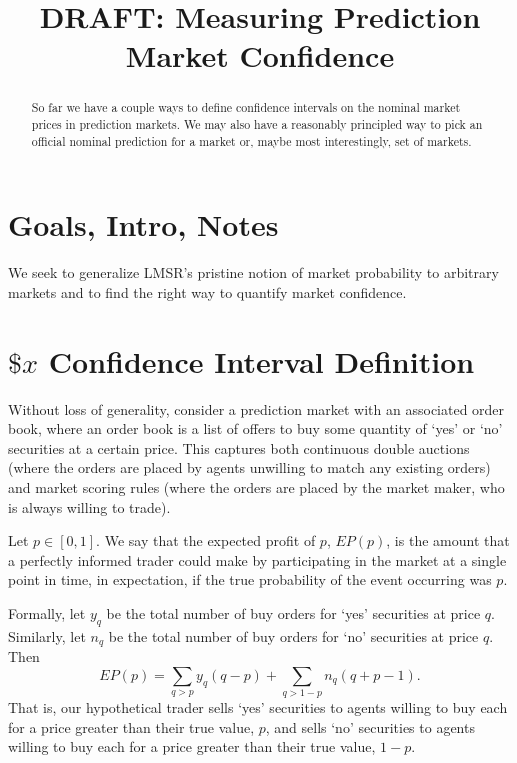 \documentclass{article}
\title{DRAFT: Measuring Prediction Market Confidence}
\author{}
\begin{document}
\maketitle

\begin{abstract}
So far we have a couple ways to define confidence intervals on the nominal market prices in prediction markets.
We may also have a reasonably principled way to pick an official nominal prediction for a market or, maybe most interestingly, set of markets.
\end{abstract}


\section{Goals, Intro, Notes}

We seek to generalize LMSR's pristine notion of market probability to arbitrary markets and to find the right way to quantify market confidence.

\section{$\$x$ Confidence Interval Definition}

Without loss of generality, consider a prediction market with an associated order book, where an order book is a list of offers to buy some quantity of `yes' or `no' securities at a certain price. 
This captures both continuous double auctions (where the orders are placed by agents unwilling to match any existing orders) and market scoring rules (where the orders are placed by the market maker, who is always willing to trade).

Let $p \in [0,1]$. 
We say that the expected profit of $p$, $EP(p)$, is the amount that a perfectly informed trader could make by participating in the market at a single point in time, in expectation, if the true probability of the event occurring was $p$.

Formally, let $y_q$ be the total number of buy orders for `yes' securities at price $q$. 
Similarly, let $n_q$ be the total number of buy orders for `no' securities at price $q$. 
Then
\[ EP(p) = \sum_{q>p} y_q(q-p) + \sum_{q>1-p} n_q(q+p-1). \]
That is, our hypothetical trader sells `yes' securities to agents willing to buy each for a price greater than their true value, $p$, and sells `no' securities to agents willing to buy each for a price greater than their true value, $1-p$.
\end{document}
